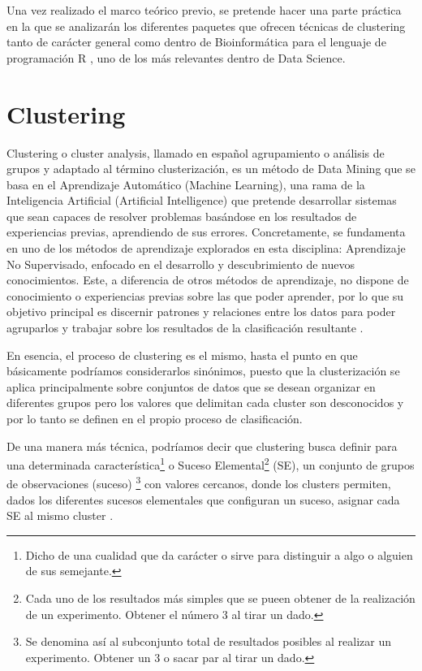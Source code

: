 \documentclass[10pt, a4paper]{article}
\begin{document}
Una vez realizado el marco teórico previo, se pretende hacer una parte práctica en la que se analizarán los diferentes paquetes que ofrecen técnicas de clustering tanto de carácter general como dentro de Bioinformática para el lenguaje de programación R \cite{6}, uno de los más relevantes dentro de Data Science.




\section{Clustering} \label{clustering}

Clustering o cluster analysis, llamado en español agrupamiento o análisis de grupos y adaptado al término clusterización, es un método de Data Mining que se basa en el Aprendizaje Automático (Machine Learning), una rama de la Inteligencia Artificial (Artificial Intelligence) que pretende desarrollar sistemas que sean capaces de resolver problemas basándose en los resultados de experiencias previas, aprendiendo de sus errores. Concretamente, se fundamenta en uno de los métodos de aprendizaje explorados en esta disciplina: Aprendizaje No Supervisado, enfocado en el desarrollo y descubrimiento de nuevos conocimientos. Este, a diferencia de otros métodos de aprendizaje, no dispone de conocimiento o experiencias previas sobre las que poder aprender, por lo que su objetivo principal es discernir patrones y relaciones entre los datos para poder agruparlos y trabajar sobre los resultados de la clasificación resultante \cite{7}.

En esencia, el proceso de clustering es el mismo, hasta el punto en que básicamente podríamos considerarlos sinónimos, puesto que la clusterización se aplica principalmente sobre conjuntos de datos que se desean organizar en diferentes grupos pero los valores que delimitan cada cluster son desconocidos y por lo tanto se definen en el propio proceso de clasificación.

De una manera más técnica, podríamos decir que clustering busca definir para una determinada característica\footnote{Dicho de una cualidad que da carácter o sirve para distinguir a algo o alguien de sus semejante.} o Suceso Elemental\footnote{Cada uno de los resultados más simples que se pueen obtener de la realización de un experimento. Obtener el número 3 al tirar un dado.} (SE), un conjunto de grupos de observaciones (suceso) \footnote{Se denomina así al subconjunto total de resultados posibles al realizar un experimento. Obtener un 3 o sacar par al tirar un dado.} con valores cercanos, donde los clusters permiten, dados los diferentes sucesos elementales que configuran un suceso, asignar cada SE al mismo cluster \cite{8}.
\end{document}
